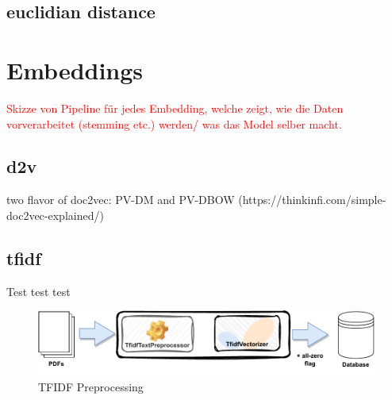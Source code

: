 \subsection{euclidian distance}\label{subsec:euclidian-distance}





\section{Embeddings}\label{sec:embeddings}

\cite{WordRep2013}
\cite{SentRep2014}

\textcolor{red}{Skizze von Pipeline für jedes Embedding, welche zeigt, wie die Daten vorverarbeitet (stemming etc.) werden/ was das Model selber macht.}


\subsection{\ac{d2v}}\label{subsec:doc2vec}
\cite{SentRep2014}
two flavor of doc2vec: PV-DM and PV-DBOW (https://thinkinfi.com/simple-doc2vec-explained/)
\cite{SkipGram2013}


\subsection{\ac{tfidf}}\label{subsec:tfidf}
Test test test
\begin{figure}[h] %
    \centering
    \includegraphics[width=1.0\textwidth]{images/TFIDF_embedding}
    \caption{TFIDF Preprocessing}
    \label{fig:tfidf_embedding}
\end{figure}

